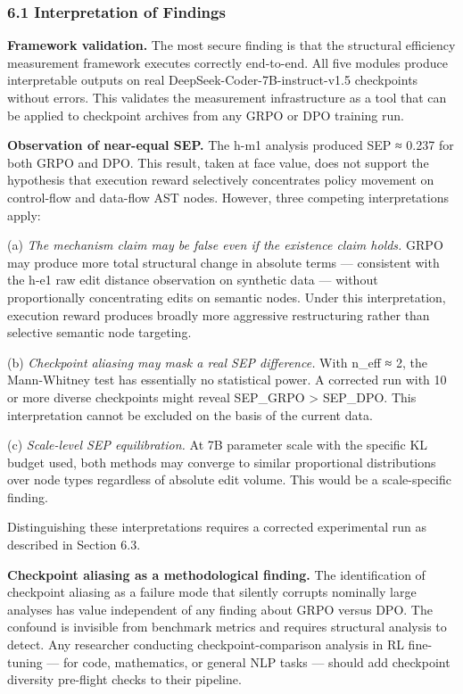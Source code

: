 
\subsubsection{6.1 Interpretation of Findings}

\textbf{Framework validation.} The most secure finding is that the structural efficiency measurement framework executes correctly end-to-end. All five modules produce interpretable outputs on real DeepSeek-Coder-7B-instruct-v1.5 checkpoints without errors. This validates the measurement infrastructure as a tool that can be applied to checkpoint archives from any GRPO or DPO training run.

\textbf{Observation of near-equal SEP.} The h-m1 analysis produced SEP ≈ 0.237 for both GRPO and DPO. This result, taken at face value, does not support the hypothesis that execution reward selectively concentrates policy movement on control-flow and data-flow AST nodes. However, three competing interpretations apply:

(a) \textit{The mechanism claim may be false even if the existence claim holds.} GRPO may produce more total structural change in absolute terms — consistent with the h-e1 raw edit distance observation on synthetic data — without proportionally concentrating edits on semantic nodes. Under this interpretation, execution reward produces broadly more aggressive restructuring rather than selective semantic node targeting.

(b) \textit{Checkpoint aliasing may mask a real SEP difference.} With n_eff ≈ 2, the Mann-Whitney test has essentially no statistical power. A corrected run with 10 or more diverse checkpoints might reveal SEP_GRPO > SEP_DPO. This interpretation cannot be excluded on the basis of the current data.

(c) \textit{Scale-level SEP equilibration.} At 7B parameter scale with the specific KL budget used, both methods may converge to similar proportional distributions over node types regardless of absolute edit volume. This would be a scale-specific finding.

Distinguishing these interpretations requires a corrected experimental run as described in Section 6.3.

\textbf{Checkpoint aliasing as a methodological finding.} The identification of checkpoint aliasing as a failure mode that silently corrupts nominally large analyses has value independent of any finding about GRPO versus DPO. The confound is invisible from benchmark metrics and requires structural analysis to detect. Any researcher conducting checkpoint-comparison analysis in RL fine-tuning — for code, mathematics, or general NLP tasks — should add checkpoint diversity pre-flight checks to their pipeline.

